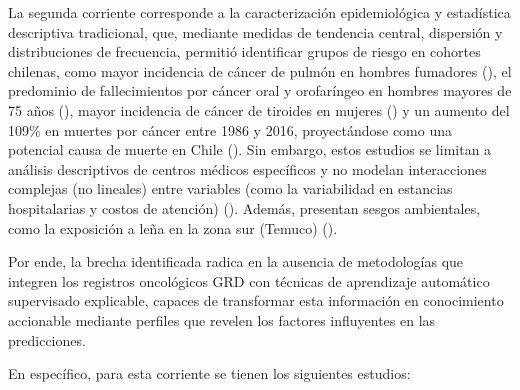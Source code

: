 La segunda corriente corresponde a la caracterización epidemiológica y estadística descriptiva tradicional, que, mediante medidas de tendencia central, dispersión y distribuciones de frecuencia, permitió identificar grupos de riesgo en cohortes chilenas, como mayor incidencia de cáncer de pulmón en hombres fumadores (\cite{scielo1}), el predominio de fallecimientos por cáncer oral y orofaríngeo en hombres mayores de 75 años (\cite{scielo2}), mayor incidencia de cáncer de tiroides en mujeres (\cite{scielo3}) y un aumento del 109\% en muertes por cáncer entre 1986 y 2016, proyectándose como una potencial causa de muerte en Chile (\cite{scielo4}). Sin embargo, estos estudios se limitan a análisis descriptivos de centros médicos específicos y no modelan interacciones complejas (no lineales) entre variables (como la variabilidad en estancias hospitalarias y costos de atención) (\cite{Wodchis2016}). Además, presentan sesgos ambientales, como la exposición a leña en la zona sur (Temuco) (\cite{scielo1}). 

Por ende, la brecha identificada radica en la ausencia de metodologías que integren los registros oncológicos GRD con técnicas de aprendizaje automático supervisado explicable, capaces de transformar esta información en conocimiento accionable mediante perfiles que revelen los factores influyentes en las predicciones. 


En específico, para esta corriente se tienen los siguientes estudios:

